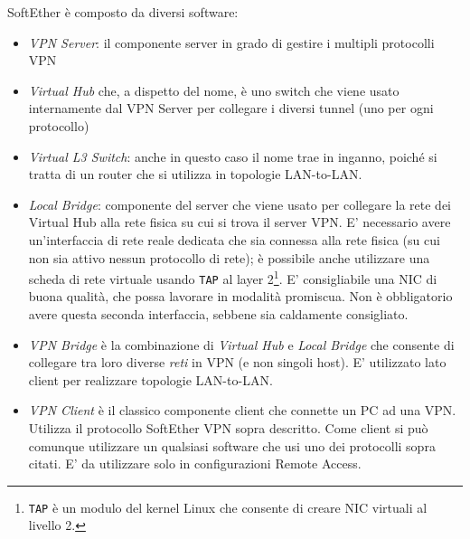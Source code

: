SoftEther è composto da diversi software:
\begin{itemize}
  \item \textit{VPN Server}: il componente server in grado di gestire i multipli
  protocolli VPN
  \item \textit{Virtual Hub} che, a dispetto del nome, è uno switch che viene usato internamente
  dal VPN Server per collegare i diversi tunnel (uno per ogni protocollo)
  \item \textit{Virtual L3 Switch}: anche in questo caso il nome trae in inganno, poiché si tratta di un
  router che si utilizza in topologie LAN-to-LAN.
  \item \textit{Local Bridge}: componente del server che viene usato per collegare la rete dei Virtual Hub
  alla rete fisica su cui si trova il server VPN. E' necessario avere un'interfaccia di rete
  reale dedicata che sia connessa alla rete fisica (su cui non sia attivo nessun protocollo di rete);
  è possibile anche utilizzare una scheda di rete virtuale usando \texttt{TAP} al layer
  2\footnote{\texttt{TAP} è un modulo del kernel Linux che consente di creare NIC virtuali al livello 2.}.
  E' consigliabile
  una NIC di buona qualità, che possa lavorare in modalità promiscua. Non è obbligatorio
  avere questa seconda interfaccia, sebbene sia caldamente consigliato.
  \item \textit{VPN Bridge} è la combinazione di \textit{Virtual Hub} e \textit{Local Bridge} che consente
  di collegare tra loro diverse \textit{reti} in VPN (e non singoli host). E' utilizzato
  lato client per realizzare topologie LAN-to-LAN.
  \item \textit{VPN Client} è il classico componente client che connette un PC ad una VPN. Utilizza il
  protocollo SoftEther VPN sopra descritto. Come client si può comunque utilizzare un qualsiasi software che
  usi uno dei protocolli sopra citati. E' da utilizzare solo in configurazioni Remote Access.
\end{itemize}


